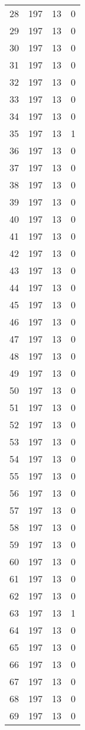 \begin{longtable}[!]{c|ccc}
	28	& 197	& 13	& 0	\\
	29	& 197	& 13	& 0	\\
	30	& 197	& 13	& 0	\\
	31	& 197	& 13	& 0	\\
	32	& 197	& 13	& 0	\\
	33	& 197	& 13	& 0	\\
	34	& 197	& 13	& 0	\\
	35	& 197	& 13	& 1	\\
	36	& 197	& 13	& 0	\\
	37	& 197	& 13	& 0	\\
	38	& 197	& 13	& 0	\\
	39	& 197	& 13	& 0	\\
	40	& 197	& 13	& 0	\\
	41	& 197	& 13	& 0	\\
	42	& 197	& 13	& 0	\\
	43	& 197	& 13	& 0	\\
	44	& 197	& 13	& 0	\\
	45	& 197	& 13	& 0	\\
	46	& 197	& 13	& 0	\\
	47	& 197	& 13	& 0	\\
	48	& 197	& 13	& 0	\\
	49	& 197	& 13	& 0	\\
	50	& 197	& 13	& 0	\\
	51	& 197	& 13	& 0	\\
	52	& 197	& 13	& 0	\\
	53	& 197	& 13	& 0	\\
	54	& 197	& 13	& 0	\\
	55	& 197	& 13	& 0	\\
	56	& 197	& 13	& 0	\\
	57	& 197	& 13	& 0	\\
	58	& 197	& 13	& 0	\\
	59	& 197	& 13	& 0	\\
	60	& 197	& 13	& 0	\\
	61	& 197	& 13	& 0	\\
	62	& 197	& 13	& 0	\\
	63	& 197	& 13	& 1	\\
	64	& 197	& 13	& 0	\\
	65	& 197	& 13	& 0	\\
	66	& 197	& 13	& 0	\\
	67	& 197	& 13	& 0	\\
	68	& 197	& 13	& 0	\\
	69	& 197	& 13	& 0	\\

\end{longtable}
